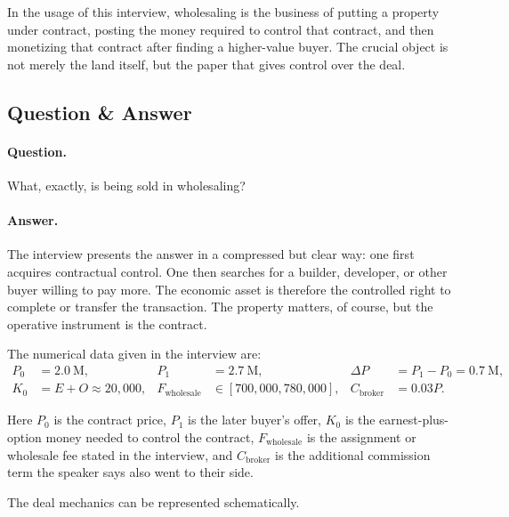 \begin{definition}
In the usage of this interview, wholesaling is the business of putting a property under contract, posting the money required to control that contract, and then monetizing that contract after finding a higher-value buyer. The crucial object is not merely the land itself, but the paper that gives control over the deal.
\end{definition}

\subsection{Question \& Answer}

\paragraph{Question.} What, exactly, is being sold in wholesaling?

\paragraph{Answer.} The interview presents the answer in a compressed but clear way: one first acquires contractual control. One then searches for a builder, developer, or other buyer willing to pay more. The economic asset is therefore the controlled right to complete or transfer the transaction. The property matters, of course, but the operative instrument is the contract.

The numerical data given in the interview are:
\begin{align}
P_0 &= 2.0\ \mathrm{M},
&
P_1 &= 2.7\ \mathrm{M},
&
\Delta P &= P_1 - P_0 = 0.7\ \mathrm{M}, \\
K_0 &= E+O \approx 20{,}000,
&
F_{\mathrm{wholesale}} &\in [700{,}000,780{,}000],
&
C_{\mathrm{broker}} &= 0.03P.
\end{align}

Here \(P_0\) is the contract price, \(P_1\) is the later buyer's offer, \(K_0\) is the earnest-plus-option money needed to control the contract, \(F_{\mathrm{wholesale}}\) is the assignment or wholesale fee stated in the interview, and \(C_{\mathrm{broker}}\) is the additional commission term the speaker says also went to their side.

The deal mechanics can be represented schematically.

